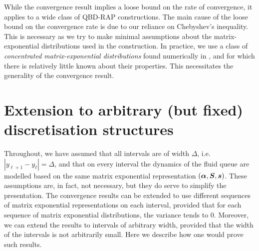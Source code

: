 \begin{rem}
	While the convergence result implies a loose bound on the rate of convergence, it applies to a wide class of QBD-RAP constructions. The main cause of the loose bound on the convergence rate is due to our reliance on Chebyshev's inequality. This is necessary as we try to make minimal assumptions about the matrix-exponential distributions used in the construction. In practice, we use a class of \emph{concentrated matrix-exponential distributions} found numerically in \citep{hhat2020}, and for which there is relatively little known about their properties. This necessitates the generality of the convergence result. 
\end{rem}

\section{Extension to arbitrary (but fixed) discretisation structures}
Throughout, we have assumed that all intervals are of width \(\Delta\), i.e.~\(|y_{\ell+1}-y_\ell|=\Delta\), and that on every interval the dynamics of the fluid queue are modelled based on the same matrix exponential representation \((\boldsymbol \alpha, \boldsymbol S, \boldsymbol s)\). These assumptions are, in fact, not necessary, but they do serve to simplify the presentation. The convergence results can be extended to use different sequences of matrix exponential representations on each interval, provided that for each sequence of matrix exponential distributions, the variance tends to \(0\). Moreover, we can extend the results to intervals of arbitrary width, provided that the width of the intervals is not arbitrarily small. Here we describe how one would prove such results.

